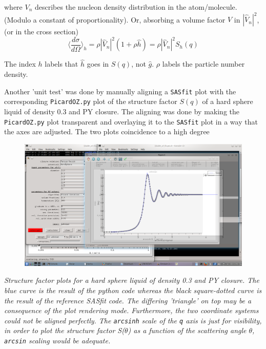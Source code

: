 \documentclass[11pt,a4paper]{article}
\begin{document}
where $V_n$ describes the nucleon density distribution in the atom/molecule. (Modulo a constant of proportionality).
Or, absorbing a volume factor $V$ in $|\hat V_n|^2$, (or in the cross section)
\begin{equation}
\langle \frac {d \sigma}{d \Omega} \rangle_h = \rho |\hat V_n|^2 (1 + \rho \hat h )
=
\rho |\hat V_n|^2 S_h(q)
\end{equation}

The index $h$ labels that $\hat h$ goes in $S(q)$, not $\hat g$. $ \rho$ labels the particle number density.

\newpage
Another 'unit test' was done by manually aligning a \texttt{SASfit} plot with the corresponding \texttt{PicardOZ.py} plot
of the structure factor $S(q)$ of a hard sphere liquid of density 0.3 and PY closure. The aligning was done by making 
the \texttt{PicardOZ.py} plot transparent and overlaying it to the \texttt{SASfit} plot in a way that the axes are adjusted. 
The two plots coincidence to a high degree


\begin{figure}[htb]
\centering
\includegraphics[width=12cm]{PyOZ-SASfit_SqHS03PY.png}
\end{figure}
\textit{Structure factor plots for a hard sphere liquid of density 0.3 and PY closure. The blue curve is the result of the
python code whereas the black square-dotted curve is the result of the reference SASfit code. The differing 'triangle' on top may be
a consequence of the plot rendering mode. Furthermore, the two coordinate systems could not be aligned perfectly. \newline
The  \texttt{arcsinh} scale of the \texttt{q} axis is just for visibility, in order to plot the structure factor S($\theta$)
as a function of the scattering angle $\theta$, \texttt{arcsin} scaling would be adequate. }
\end{document}
